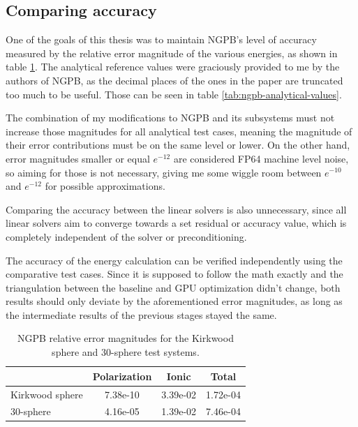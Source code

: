 \subsection{Comparing accuracy}
\label{sec:evaluation-experimental-setup-comparing-accuracy}

One of the goals of this thesis was to maintain NGPB's level of accuracy measured by the relative error magnitude of the various energies, as shown in table \ref{tab:ngpb-error-magnitudes}. 
The analytical reference values were graciously provided to me by the authors of NGPB, as the decimal places of the ones in the paper are truncated too much to be useful. Those can be seen in table \ref{tab:ngpb-analytical-values}.

The combination of my modifications to NGPB and its subsystems must not increase those magnitudes for all analytical test cases, meaning the magnitude of their error contributions must be on the same level or lower. 
On the other hand, error magnitudes smaller or equal $e^{-12}$ are considered FP64 machine level noise, so aiming for those is not necessary, giving me some wiggle room between $e^{-10}$ and $e^{-12}$ for possible approximations. 

Comparing the accuracy between the linear solvers is also unnecessary, since all linear solvers aim to converge towards a set residual or accuracy value, which is completely independent of the solver or preconditioning. 

The accuracy of the energy calculation can be verified independently using the comparative test cases.
Since it is supposed to follow the math exactly and the triangulation between the baseline and GPU optimization didn't change, both results should only deviate by the aforementioned error magnitudes, as long as the intermediate results of the previous stages stayed the same.

\begin{table}[htbp]
    \centering
    \begin{tabular}{lccc}
        \toprule
         & Polarization & Ionic & Total \\
        \midrule
        Kirkwood sphere & 7.38e-10 & 3.39e-02 & 1.72e-04 \\
        30-sphere       & 4.16e-05 & 1.39e-02 & 7.46e-04 \\
        \bottomrule
    \end{tabular}
    \caption{NGPB relative error magnitudes for the Kirkwood sphere and 30-sphere test systems.}
    \label{tab:ngpb-error-magnitudes}
\end{table}

